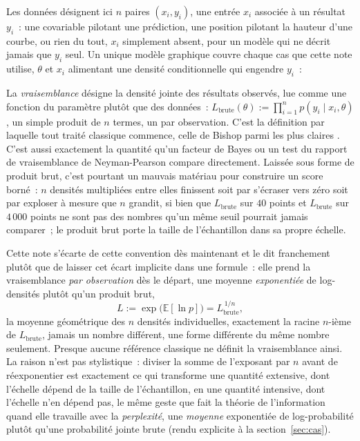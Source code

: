 \documentclass[11pt]{article}
\begin{document}
Les données désignent ici $n$ paires $(x_i, y_i)$, une entrée $x_i$
associée à un résultat $y_i$~: une covariable pilotant une prédiction,
une position pilotant la hauteur d'une courbe, ou rien du tout, $x_i$
simplement absent, pour un modèle qui ne décrit jamais que $y_i$ seul.
Un unique modèle graphique couvre chaque cas que cette note utilise,
$\theta$ et $x_i$ alimentant une densité conditionnelle qui engendre
$y_i$~:

\begin{center}
\end{center}

La \emph{vraisemblance} désigne la densité jointe des résultats
observés, lue comme une fonction du paramètre plutôt que des
données~: $L_{\text{brute}}(\theta) := \prod_{i=1}^n p(y_i \mid x_i,
\theta)$, un simple produit de $n$ termes, un par observation. C'est la
définition par laquelle tout traité classique commence, celle de
Bishop parmi les plus claires \citep{bishop2006prml}. C'est aussi
exactement la quantité qu'un facteur de Bayes ou un test du rapport de
vraisemblance de Neyman-Pearson compare directement. Laissée sous
forme de produit brut, c'est pourtant un mauvais matériau pour
construire un score borné~: $n$ densités multipliées entre elles
finissent soit par s'écraser vers zéro soit par exploser à mesure que
$n$ grandit, si bien que $L_{\text{brute}}$ sur $40$ points et
$L_{\text{brute}}$ sur $4\,000$ points ne sont pas des nombres qu'un
même seuil pourrait jamais comparer~; le produit brut porte la taille
de l'échantillon dans sa propre échelle.

Cette note s'écarte de cette convention dès maintenant et le dit
franchement plutôt que de laisser cet écart implicite dans une
formule~: elle prend la vraisemblance \emph{par observation} dès le
départ, une moyenne \emph{exponentiée} de log-densités plutôt qu'un
produit brut,
$$L := \exp\!\big(\mathbb E[\ln p]\big) = L_{\text{brute}}^{\,1/n},$$
la moyenne géométrique des $n$ densités individuelles, exactement la
racine $n$-ième de $L_{\text{brute}}$, jamais un nombre différent, une
forme différente du même nombre seulement. Presque aucune référence
classique ne définit la vraisemblance ainsi. La raison n'est pas
stylistique~: diviser la somme de l'exposant par $n$ avant de
réexponentier est exactement ce qui transforme une quantité extensive,
dont l'échelle dépend de la taille de l'échantillon, en une quantité
intensive, dont l'échelle n'en dépend pas, le même geste que fait la
théorie de l'information quand elle travaille avec la
\emph{perplexité}, une \emph{moyenne} exponentiée de log-probabilité
plutôt qu'une probabilité jointe brute (rendu explicite à la
section~\ref{sec:cas}).
\end{document}
